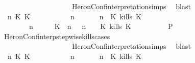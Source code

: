 \begin{isabellebody}
\ \ \ \ \ \ \ \ \ \ \ \ \ \ \ \ \ \ \ \ HeronConf{\isacharunderscore}interpretation{\isachardot}simps\ \isamarkupfalse%
\ blast\isanewline
\ \ \ \ \isamarkupfalse%
\isanewline
\ \ \ \ \ \ \isamarkupfalse%
\ {\isasymGamma}\ n\ K\ K\ {\isasymPsi}\ {\isasymPhi}\isanewline
\ \ \ \ \ \ \isamarkupfalse%
\ {\isacartoucheopen}{\isacharparenleft}{\isasymGamma}\ n\ {\isasymturnstile}\ {\isasymPsi}\ {\isasymtriangleright}\ {\isasymPhi}\ {\isacharequal}\ {\isacharparenleft}{\isasymGamma}{\isacharcomma}\ n\ {\isasymturnstile}\ {\isacharparenleft}{\isacharparenleft}K\ kills\ K\ {\isacharhash}\ {\isasymPsi}{\isacharparenright}\ {\isasymtriangleright}\ {\isasymPhi}{\isacharparenright}{\isacartoucheclose}\isanewline
\ \ \ \ \ \ \ {\isacartoucheopen}{\isacharparenleft}{\isasymGamma}\ n\ {\isasymturnstile}\ {\isasymPsi}\ {\isasymtriangleright}\ {\isasymPhi}\ {\isacharequal}\ {\isacharparenleft}{\isacharparenleft}{\isacharparenleft}K\ {\isasymnot}{\isasymUp}\ n{\isacharparenright}\ {\isacharhash}\ {\isasymGamma}{\isacharparenright}{\isacharcomma}\ n\ {\isasymturnstile}\ {\isasymPsi}\ {\isasymtriangleright}\ {\isacharparenleft}{\isacharparenleft}K\ kills\ K\ {\isacharhash}\ {\isasymPhi}{\isacharparenright}{\isacharparenright}{\isacartoucheclose}\isanewline
\ \ \ \ \ \ \isamarkupfalse%
\ {\isacharquery}P\ \isamarkupfalse%
\ HeronConf{\isacharunderscore}interp{\isacharunderscore}stepwise{\isacharunderscore}kills{\isacharunderscore}cases\isanewline
\ \ \ \ \ \ \ \ \ \ \ \ \ \ \ \ \ \ \ \ HeronConf{\isacharunderscore}interpretation{\isachardot}simps\ \isamarkupfalse%
\ blast\isanewline
\ \ \ \ \isamarkupfalse%
\isanewline
\ \ \ \ \ \ \isamarkupfalse%
\ {\isasymGamma}\ n\ K\ K\ {\isasymPsi}\ {\isasymPhi}\isanewline
\ \ \ \ \ \ \isamarkupfalse%
\ {\isacartoucheopen}{\isacharparenleft}{\isasymGamma}\ n\ {\isasymturnstile}\ {\isasymPsi}\ {\isasymtriangleright}\ {\isasymPhi}\ {\isacharequal}\ {\isacharparenleft}{\isasymGamma}{\isacharcomma}\ n\ {\isasymturnstile}\ {\isacharparenleft}{\isacharparenleft}K\ kills\ K\ {\isacharhash}\ {\isasymPsi}{\isacharparenright}\ {\isasymtriangleright}\ {\isasymPhi}{\isacharparenright}{\isacartoucheclose}\isanewline

\end{isabellebody}
